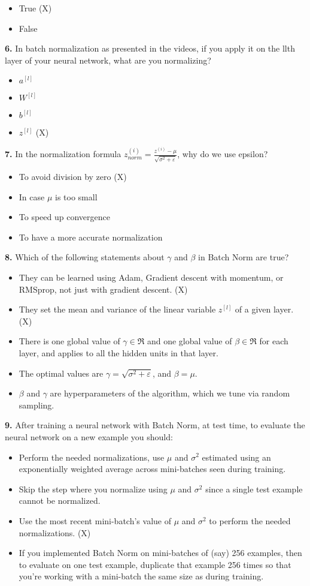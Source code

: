 \begin{itemize}
    \item True (X)
    \item False
\end{itemize}
\textbf{6.} In batch normalization as presented in the videos, if you apply it on the llth layer of your neural network, what are you normalizing?
\begin{itemize}
    \item $a^{[l]}$
    \item $W^{[l]}$
    \item $b^{[l]}$
    \item $z^{[l]}$ (X) 
\end{itemize}
\textbf{7.} In the normalization formula $z_{norm}^{(i)} = \frac{z^{(i)} - \mu}{\sqrt{\sigma^2 + \varepsilon}}$, why do we use epsilon?
\begin{itemize}
    \item To avoid division by zero (X)
    \item In case $\mu$ is too small
    \item To speed up convergence
    \item To have a more accurate normalization
\end{itemize}
\textbf{8.} Which of the following statements about $\gamma$ and $\beta$ in Batch Norm are true?
\begin{itemize}
    \item They can be learned using Adam, Gradient descent with momentum, or RMSprop, not just with gradient descent. (X)
    \item They set the mean and variance of the linear variable $z^[l]$ of a given layer. (X)
    \item There is one global value of $\gamma \in \Re$ and one global value of $\beta \in \Re$ for each layer, and applies to all the hidden units in that layer.
    \item The optimal values are $\gamma = \sqrt{\sigma^2 + \varepsilon}$, and $\beta = \mu$.
    \item $\beta$ and $\gamma$ are hyperparameters of the algorithm, which we tune via random sampling.
\end{itemize}
\textbf{9.} After training a neural network with Batch Norm, at test time, to evaluate the neural network on a new example you should:
\begin{itemize}
    \item Perform the needed normalizations, use $\mu$ and $\sigma^2$ estimated using an exponentially weighted average across mini-batches seen during training.
    \item Skip the step where you normalize using $\mu$ and $\sigma^2$ since a single test example cannot be normalized.
    \item Use the most recent mini-batch’s value of $\mu$ and $\sigma^2$ to perform the needed normalizations. (X)
    \item If you implemented Batch Norm on mini-batches of (say) 256 examples, then to evaluate on one test example, duplicate that example 256 times so that you’re working with a mini-batch the same size as during training.
\end{itemize}

